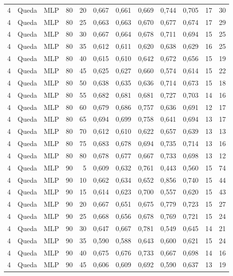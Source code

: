 \begin{longtable}{@{}rllrrrrrrrrr@{}}
4 & Queda & MLP & 80 & 20 & 0,667 & 0,661 & 0,669 & 0,744 & 0,705 & 17 & 30 \\
4 & Queda & MLP & 80 & 25 & 0,663 & 0,663 & 0,670 & 0,677 & 0,674 & 17 & 29 \\
4 & Queda & MLP & 80 & 30 & 0,667 & 0,664 & 0,678 & 0,711 & 0,694 & 15 & 25 \\
4 & Queda & MLP & 80 & 35 & 0,612 & 0,611 & 0,620 & 0,638 & 0,629 & 16 & 25 \\
4 & Queda & MLP & 80 & 40 & 0,615 & 0,610 & 0,642 & 0,672 & 0,656 & 15 & 19 \\
4 & Queda & MLP & 80 & 45 & 0,625 & 0,627 & 0,660 & 0,574 & 0,614 & 15 & 22 \\
4 & Queda & MLP & 80 & 50 & 0,638 & 0,635 & 0,636 & 0,714 & 0,673 & 15 & 18 \\
4 & Queda & MLP & 80 & 55 & 0,682 & 0,681 & 0,681 & 0,727 & 0,703 & 14 & 16 \\
4 & Queda & MLP & 80 & 60 & 0,679 & 0,686 & 0,757 & 0,636 & 0,691 & 12 & 17 \\
4 & Queda & MLP & 80 & 65 & 0,694 & 0,699 & 0,758 & 0,641 & 0,694 & 13 & 17 \\
4 & Queda & MLP & 80 & 70 & 0,612 & 0,610 & 0,622 & 0,657 & 0,639 & 13 & 13 \\
4 & Queda & MLP & 80 & 75 & 0,683 & 0,678 & 0,694 & 0,735 & 0,714 & 13 & 16 \\
4 & Queda & MLP & 80 & 80 & 0,678 & 0,677 & 0,667 & 0,733 & 0,698 & 13 & 12 \\
4 & Queda & MLP & 90 & 5 & 0,609 & 0,632 & 0,761 & 0,443 & 0,560 & 15 & 74 \\
4 & Queda & MLP & 90 & 10 & 0,662 & 0,634 & 0,652 & 0,856 & 0,740 & 15 & 44 \\
4 & Queda & MLP & 90 & 15 & 0,614 & 0,623 & 0,700 & 0,557 & 0,620 & 15 & 43 \\
4 & Queda & MLP & 90 & 20 & 0,667 & 0,651 & 0,675 & 0,779 & 0,723 & 15 & 27 \\
4 & Queda & MLP & 90 & 25 & 0,668 & 0,656 & 0,678 & 0,769 & 0,721 & 15 & 24 \\
4 & Queda & MLP & 90 & 30 & 0,647 & 0,667 & 0,781 & 0,549 & 0,645 & 14 & 21 \\
4 & Queda & MLP & 90 & 35 & 0,590 & 0,588 & 0,643 & 0,600 & 0,621 & 15 & 24 \\
4 & Queda & MLP & 90 & 40 & 0,675 & 0,676 & 0,733 & 0,667 & 0,698 & 14 & 16 \\
4 & Queda & MLP & 90 & 45 & 0,606 & 0,609 & 0,692 & 0,590 & 0,637 & 13 & 19 \\

\end{longtable}
